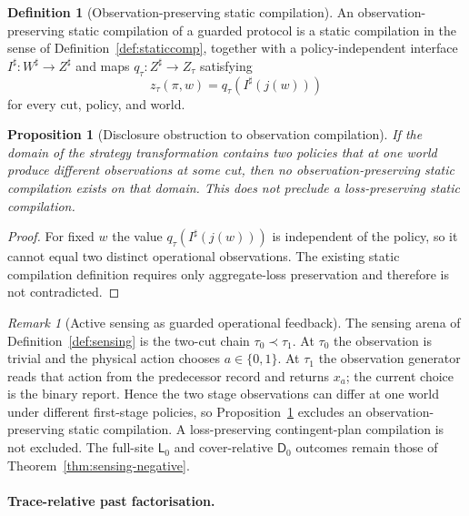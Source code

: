 \documentclass[11pt]{article}
\theoremstyle{plain}
\newtheorem{proposition}[theorem]{Proposition}
\theoremstyle{definition}
\newtheorem{definition}[theorem]{Definition}
\theoremstyle{remark}
\newtheorem{remark}[theorem]{Remark}
\begin{document}
\begin{definition}[Observation-preserving static compilation]
\label{def:observation-compilation}
An observation-preserving static compilation of a guarded protocol is a static
compilation in the sense of Definition~\ref{def:staticcomp}, together with a
policy-independent interface $I^\sharp:W^\sharp\to Z^\sharp$ and maps
$q_\tau:Z^\sharp\to Z_\tau$ satisfying
\[
z_\tau(\pi,w)=q_\tau(I^\sharp(j(w)))
\]
for every cut, policy, and world.
\end{definition}

\begin{proposition}[Disclosure obstruction to observation compilation]
\label{prop:observation-compilation-no-go}
If the domain of the strategy transformation contains two policies that at one
world produce different observations at some cut, then no observation-preserving
static compilation exists on that domain. This does not preclude a
loss-preserving static compilation.
\end{proposition}

\begin{proof}
For fixed $w$ the value $q_\tau(I^\sharp(j(w)))$ is independent of the policy,
so it cannot equal two distinct operational observations. The existing static
compilation definition requires only aggregate-loss preservation and therefore
is not contradicted.
\end{proof}


\begin{remark}[Active sensing as guarded operational feedback]
\label{rem:sensing-operational}
The sensing arena of Definition~\ref{def:sensing} is the two-cut chain
$\tau_0\prec\tau_1$. At $\tau_0$ the observation is trivial and the physical
action chooses $a\in\{0,1\}$. At $\tau_1$ the observation generator reads that
action from the predecessor record and returns $x_a$; the current choice is the
binary report. Hence the two stage observations can differ at one world under
different first-stage policies, so
Proposition~\ref{prop:observation-compilation-no-go} excludes an
observation-preserving static compilation. A loss-preserving contingent-plan
compilation is not excluded. The full-site $\mathsf L_0$ and cover-relative
$\mathsf D_0$ outcomes remain those of
Theorem~\ref{thm:sensing-negative}.
\end{remark}

\paragraph{Trace-relative past factorisation.}
\end{document}
